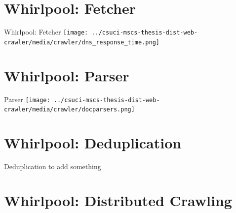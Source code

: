 \documentclass[9pt]{beamer}
\begin{document}

\section[Fetcher]{Whirlpool: Fetcher}
\begin{frame}[plain]
\end{frame}


\begin{frame}{Whirlpool: Fetcher}
  \centering
  \texttt{[image: ../csuci-mscs-thesis-dist-web-crawler/media/crawler/dns\_response\_time.png]}
\end{frame}


\section[Parser]{Whirlpool: Parser}
\begin{frame}[plain]
\end{frame}


\begin{frame}{Parser}
  \centering
  \texttt{[image: ../csuci-mscs-thesis-dist-web-crawler/media/crawler/docparsers.png]}
\end{frame}


\section[Dedupe]{Whirlpool: Deduplication}
\begin{frame}[plain]
\end{frame}


\begin{frame}{Deduplication}
  to add something
\end{frame}


\section[Dist. Crawl]{Whirlpool: Distributed Crawling}
\begin{frame}[plain]
\end{frame}
\end{document}
